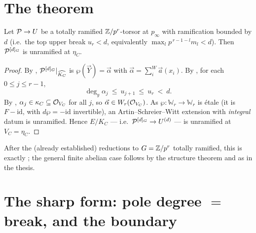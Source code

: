 \documentclass[11pt]{article}
\providecommand{\W}{\mathbb{W}}
\begin{document}
\section{The theorem}\label{sec:theorem}

\begin{theorem}\label{thm:main}
Let $\mathcal{P}\to U$ be a totally ramified $\mathbb{Z}/p^r$-torsor at $p_\infty$ with
ramification bounded by $d$ (i.e.\ the top upper break $u_r<d$, equivalently
$\max_l p^{\,r-1-l}m_l<d$). Then $\mathcal{P}^{[d]_G}$ is unramified at $\eta_C$.
\end{theorem}

\begin{proof}
By , $\mathcal{P}^{[d]_G}|_{\widehat{K_C}}$ is $\wp(\vec Y)=\vec\alpha$
with $\vec\alpha=\sum_i^{W}\vec a(x_i)$. By , for each
$0\le j\le r-1$,
\[
\deg_y\alpha_j\ \le\ u_{j+1}\ \le\ u_r\ <\ d .
\]
By , $\alpha_j\in\kappa_C\subseteq\mathcal{O}_{V_C}$ for all $j$, so
$\vec\alpha\in W_r(\mathcal{O}_{V_C})$. As $\wp:\W_r\to\W_r$ is étale (it is $F-\mathrm{id}$,
with $d\wp=-\mathrm{id}$ invertible), an Artin--Schreier--Witt extension with
\emph{integral} datum is unramified. Hence $E/K_C$ --- i.e.\ $\mathcal{P}^{[d]_G}\to
U^{(d)}$ --- is unramified at $V_C=\eta_C$.
\end{proof}

\noindent After the (already established) reductions to $G=\mathbb{Z}/p^r$ totally
ramified, this is exactly
; the general finite
abelian case follows by the structure theorem and
 as in the thesis.

\section{The sharp form: pole degree $=$ break, and the boundary}\label{sec:sharp}
\end{document}
